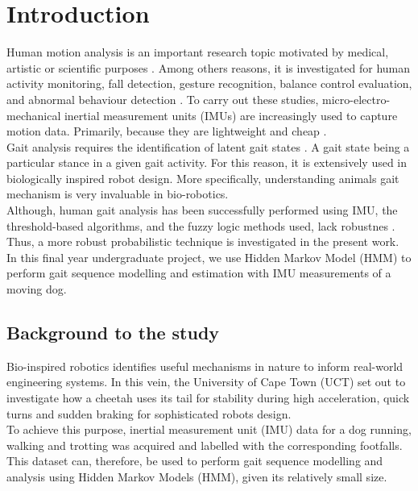 \chapter{Introduction} \label{chap:intro}

Human motion analysis is an important research topic motivated by medical, artistic or scientific purposes \cite{towa2009}. Among others reasons, it is investigated for human activity monitoring, fall detection, gesture recognition, balance control evaluation, and abnormal behaviour detection \cite{cont2013}. To carry out these studies, micro-electro-mechanical inertial measurement units (IMUs) are increasingly used to capture motion data. Primarily, because they are lightweight and cheap \cite{ches2012} \cite{towa2009} \cite{cont2013}.\\
Gait analysis requires the identification of latent gait states \cite{cont2013}. A gait state being a particular stance in a given gait activity.
For this reason, it is extensively used in biologically inspired robot design. More specifically, understanding animals gait mechanism is very invaluable in bio-robotics.\\
Although, human gait analysis has been successfully performed using IMU, the threshold-based algorithms, %
and the fuzzy logic methods %
used, lack robustnes \cite{cont2013}. Thus, a more robust probabilistic technique is investigated in the present work. In this final year undergraduate project, we use Hidden Markov Model (HMM) to perform gait sequence modelling and estimation with IMU measurements of a moving dog.


\section{Background to the study}
Bio-inspired robotics identifies useful mechanisms in nature to inform real-world engineering systems. In this vein, the University of Cape Town (UCT) set out to investigate how a cheetah uses its tail for stability during high acceleration, quick turns and sudden braking for sophisticated robots design. \\
To achieve this purpose, inertial measurement unit (IMU) data for a dog running, walking and trotting was acquired and labelled with the corresponding footfalls.\\
This dataset can, therefore, be used to perform gait sequence modelling and analysis using Hidden Markov Models (HMM), given its relatively small size. 	%

